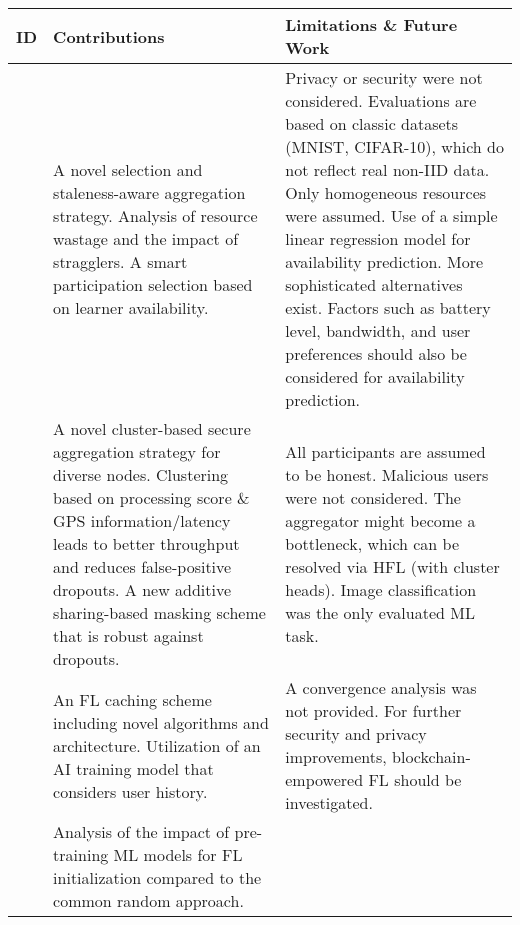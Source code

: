 \begin{changemargin}{-2cm}{0cm}
    \begin{tabular}{|c||m{0.4\paperwidth}|m{0.4\paperwidth}|}
        \hline
            ID & Contributions & Limitations \& Future Work \\
        \hline
            \cite{paper:refl_resource_efficient_fl}
            &
            A novel selection and staleness-aware aggregation strategy.
            Analysis of resource wastage and the impact of stragglers.
            A smart participation selection based on learner availability.
            &
            Privacy or security were not considered.
            Evaluations are based on classic datasets (MNIST, CIFAR-10), which do not reflect real non-IID data.
            Only homogeneous resources were assumed.
            Use of a simple linear regression model for availability prediction.
            More sophisticated alternatives exist.
            Factors such as battery level, bandwidth, and user preferences should also be considered for availability prediction.
        \\
        \hline
            \cite{paper:cluster_based_secure_aggregation_for_fl}
            &
            A novel cluster-based secure aggregation strategy for diverse nodes.
            Clustering based on processing score \& GPS information/latency leads to better throughput and reduces false-positive dropouts.
            A new additive sharing-based masking scheme that is robust against dropouts.
            &
            All participants are assumed to be honest.
            Malicious users were not considered.
            The aggregator might become a bottleneck, which can be resolved via HFL (with cluster heads).
            Image classification was the only evaluated ML task.
        \\
        \hline
            \cite{paper:privacy_preserving_deep_fl_for_coop_hierarchical_caching_in_fog_computing}
            &
            An FL caching scheme including novel algorithms and architecture.
            Utilization of an AI training model that considers user history.
            &
            A convergence analysis was not provided.
            For further security and privacy improvements, blockchain-empowered FL should be investigated.
        \\
        \hline
            \cite{paper:model_pretraining_and_initialization_for_fl}
            &
            Analysis of the impact of pre-training ML models for FL initialization compared to the common random approach.

\end{tabular}
\end{changemargin}
